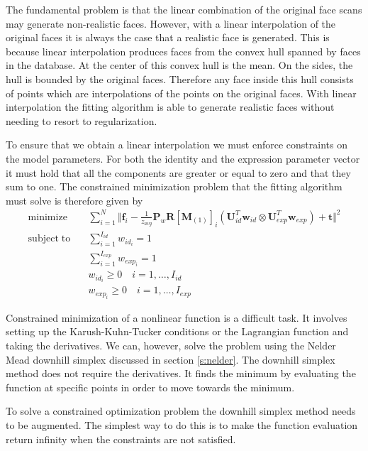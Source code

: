\documentclass[11pt,a4paper,twoside]{report}
\begin{document}
The fundamental problem is that the linear
combination of the original face scans may generate non-realistic faces. However, with a linear interpolation of
the original faces it is always the case that a realistic face is
generated. This is because linear interpolation produces faces from the convex hull spanned by
faces in the database. At the center of this convex hull is the mean. On the
sides, the hull
is bounded by the original faces. Therefore any face inside this hull consists
of points which are interpolations of the points on the original faces. With linear interpolation the fitting algorithm is able to generate realistic faces without needing to resort to regularization.

To ensure that we obtain a linear interpolation we must enforce constraints on
the model parameters. For both the identity and the expression parameter vector
it must hold that all the components are greater or equal to zero and
that they sum to one. The constrained minimization problem that the fitting
algorithm must solve is therefore given by
\begin{align}\label{eq:optprob}
\mathrm{minimize}\quad &\sum_{i=1}^N \Big\Vert\mathbf{f}_i - \frac{1}{z_{avg}}\mathbf{P}_w\mathbf{R}[\mathbf{M}_{(1)}]_{i}(\mathbf{U}_{id}^T\mathbf{w}_{id} \otimes
\mathbf{U}_{exp}^T\mathbf{w}_{exp}) + \mathbf{t}\Big\Vert^2\\
\mathrm{subject\; to}\quad &\sum_{i=1}^{I_{id}} w_{id_i} = 1\\
&\sum_{i=1}^{I_{exp}} w_{exp_i} = 1\\
\label{eq:nonneg1}
&w_{id_i} \ge 0 \quad i=1,\ldots ,I_{id}\\\label{eq:nonneg2}
&w_{exp_i} \ge 0 \quad i=1,\ldots ,I_{exp}
\end{align}

Constrained minimization of a nonlinear function is a difficult task. It
involves setting up the Karush-Kuhn-Tucker conditions or the Lagrangian function
and taking the derivatives. We can, however, solve the problem using the Nelder
Mead downhill simplex discussed in section \ref{s:nelder}. The downhill simplex
method does not require the derivatives. It finds the minimum by evaluating the
function at specific points in order to move towards the minimum. 

To solve a constrained optimization problem the downhill simplex method needs to
be augmented. The simplest way to do this is to make the function evaluation
return infinity when the constraints are not satisfied. 
\end{document}
